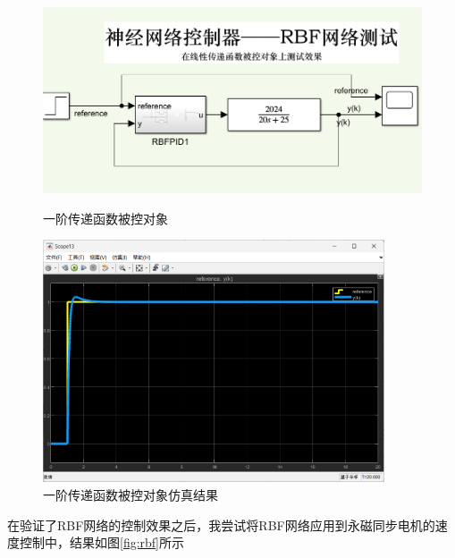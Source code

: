 \documentclass[12pt,a4paper,UTF8]{article}
\begin{document}
\begin{figure}[htbp]
    \begin{minipage}{0.48\textwidth}
        \centering
        \includegraphics[width=\textwidth]{2024-12-30-14-03-28.png}
        \caption{一阶传递函数被控对象}
    \end{minipage}
    \hfill
    \begin{minipage}{0.48\textwidth}
        \centering
        \includegraphics[width=0.9\textwidth]{2024-12-30-14-03-11.png}
        \caption{一阶传递函数被控对象仿真结果}
    \end{minipage}
\end{figure}
\newpage
在验证了RBF网络的控制效果之后，我尝试将RBF网络应用到永磁同步电机的速度控制中，结果如图\ref{fig:rbf}所示
\end{document}

